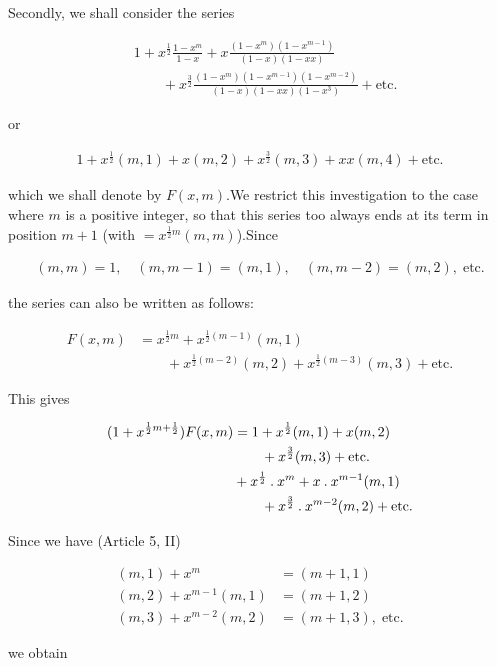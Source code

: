 
Secondly, we shall consider the series

\[
\begin{aligned}
&1+x^{\frac12}\frac{1-x^m}{1-x}+x\frac{(1-x^m)(1-x^{m-1})}{(1-x)(1-xx)}\\
&\qquad+x^{\frac32}\frac{(1-x^m)(1-x^{m-1})(1-x^{m-2})}{(1-x)(1-xx)(1-x^3)}+\text{etc.}
\end{aligned}
\]

or

\[
\begin{aligned}
1+x^{\frac12}(m,1)+x(m,2)+x^{\frac32}(m,3)+xx(m,4)+\text{etc.}
\end{aligned}
\]

which we shall denote by $F(x,m)$.\quad We restrict this investigation to the case where $m$ is a positive integer, so that this series too always ends
at its term in position $m+1$ (with $=x^{\frac12m}(m,m)$).\quad Since

\[
\begin{aligned}
(m,m)=1,\quad(m,m-1)=(m,1),\quad(m,m-2)=(m,2),\;\text{etc.}
\end{aligned}
\]

the series can also be written as follows:

\[
\begin{aligned}
F(x,m)&=x^{\frac12m}+x^{\frac12(m-1)}(m,1)\\&\qquad+x^{\frac12(m-2)}(m,2)+x^{\frac12(m-3)}(m,3)+\text{etc.}
\end{aligned}
\]

This gives

\[
\begin{aligned}
(1+x^{\frac12m+\frac12})F(x,m)&=1+x^{\frac12}(m,1)+x(m,2)\\&\qquad+x^{\frac32}(m,3)+\text{etc.}\\
&+x^{\frac12}\mathbin{.} x^m+x\mathbin{.} x^{m-1}(m,1)\\&\qquad+x^{\frac32}\mathbin{.} x^{m-2}(m,2)+\text{etc.}
\end{aligned}
\]

Since we have (Article 5, II)

\[
\begin{aligned}
(m,1)+x^m&=(m+1,1)\\
(m,2)+x^{m-1}(m,1)&=(m+1,2)\\
(m,3)+x^{m-2}(m,2)&=(m+1,3),\;\text{etc.}
\end{aligned}
\]

we obtain

